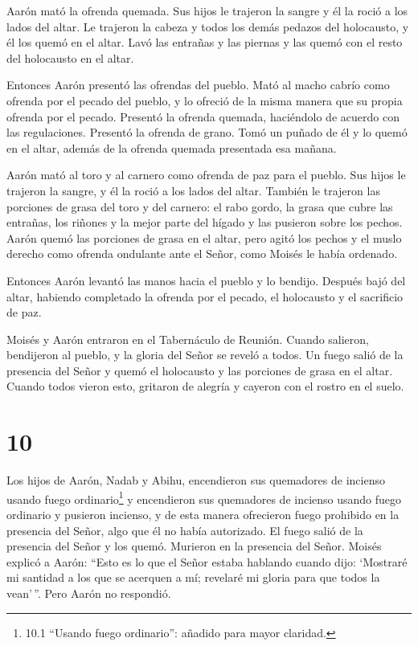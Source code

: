  Aarón mató la ofrenda quemada. Sus hijos le trajeron la
sangre y él la roció a los lados del altar.  Le trajeron la
cabeza y todos los demás pedazos del holocausto, y él los quemó en el
altar.  Lavó las entrañas y las piernas y las quemó con el
resto del holocausto en el altar.

 Entonces Aarón presentó las ofrendas del pueblo. Mató al
macho cabrío como ofrenda por el pecado del pueblo, y lo ofreció de la
misma manera que su propia ofrenda por el pecado.  Presentó
la ofrenda quemada, haciéndolo de acuerdo con las regulaciones.
 Presentó la ofrenda de grano. Tomó un puñado de él y lo
quemó en el altar, además de la ofrenda quemada presentada esa mañana.

 Aarón mató al toro y al carnero como ofrenda de paz para
el pueblo. Sus hijos le trajeron la sangre, y él la roció a los lados
del altar.  También le trajeron las porciones de grasa del
toro y del carnero: el rabo gordo, la grasa que cubre las entrañas, los
riñones y la mejor parte del hígado  y las pusieron sobre
los pechos. Aarón quemó las porciones de grasa en el altar,
 pero agitó los pechos y el muslo derecho como ofrenda
ondulante ante el Señor, como Moisés le había ordenado.

 Entonces Aarón levantó las manos hacia el pueblo y lo
bendijo. Después bajó del altar, habiendo completado la ofrenda por el
pecado, el holocausto y el sacrificio de paz.

 Moisés y Aarón entraron en el Tabernáculo de Reunión.
Cuando salieron, bendijeron al pueblo, y la gloria del Señor se reveló a
todos.  Un fuego salió de la presencia del Señor y quemó el
holocausto y las porciones de grasa en el altar. Cuando todos vieron
esto, gritaron de alegría y cayeron con el rostro en el suelo.

\hypertarget{section-9}{%
\section{10}\label{section-9}}

 Los hijos de Aarón, Nadab y Abihu, encendieron sus
quemadores de incienso usando fuego ordinario\footnote{10.1 ``Usando
  fuego ordinario'': añadido para mayor claridad.} y encendieron sus
quemadores de incienso usando fuego ordinario y pusieron incienso, y de
esta manera ofrecieron fuego prohibido en la presencia del Señor, algo
que él no había autorizado.  El fuego salió de la presencia
del Señor y los quemó. Murieron en la presencia del Señor. 
Moisés explicó a Aarón: ``Esto es lo que el Señor estaba hablando cuando
dijo: `Mostraré mi santidad a los que se acerquen a mí; revelaré mi
gloria para que todos la vean'\,''. Pero Aarón no respondió.


